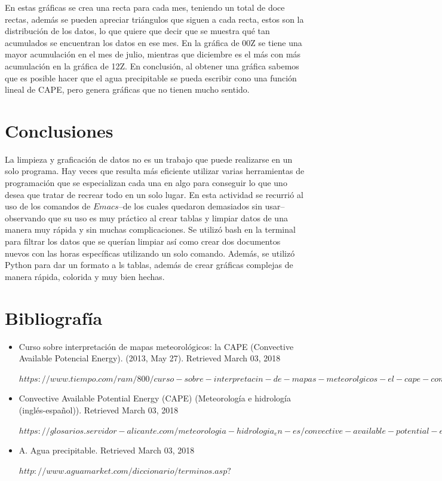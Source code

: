 \documentclass{article}
\begin{document}
En estas gráficas se crea una recta para cada mes, teniendo un total de doce rectas, además se pueden apreciar triángulos que siguen a cada recta, estos son la distribución de los datos, lo que quiere que decir que se muestra qué tan acumulados se encuentran los datos en ese mes. En la gráfica de 00Z se tiene una mayor acumulación en el mes de julio, mientras que diciembre es el más con más acumulación en la gráfica de 12Z. En conclusión, al obtener una gráfica sabemos que es posible hacer que el agua precipitable se pueda escribir cono una función lineal de CAPE, pero genera gráficas que no tienen mucho sentido.

\section{Conclusiones}
La limpieza y graficación de datos no es un trabajo que puede realizarse en un solo programa. Hay veces que resulta más eficiente utilizar varias herramientas de programación que se especializan cada una en algo para conseguir lo que uno desea que tratar de recrear todo en un solo lugar. En esta actividad se recurrió al uso de los comandos de $Emacs$--de los cuales quedaron demasiados sin usar--observando que su uso es muy práctico al crear tablas y limpiar datos de una manera muy rápida y sin muchas complicaciones. Se utilizó bash en la terminal para filtrar los datos que se querían limpiar así como crear dos documentos nuevos con las horas específicas utilizando un solo comando. Además, se utilizó Python para dar un formato a ls tablas, además de crear gráficas complejas de manera rápida, colorida y muy bien hechas.

\section{Bibliografía}
\begin{itemize}
\item Curso sobre interpretación de mapas meteorológicos: la CAPE (Convective Available Potencial Energy). (2013, May 27). Retrieved March 03, 2018

$https://www.tiempo.com/ram/800/curso-sobre-interpretacin-de-mapas-meteorolgicos-el-cape-convective-available-potencial-energy/$

\item Convective Available Potential Energy (CAPE) (Meteorología e hidrología (inglés-español)). Retrieved March 03, 2018

$https://glosarios.servidor-alicante.com/meteorologia-hidrologia_en-es/convective-available-potential-energy-cape$

\item A. Agua precipitable. Retrieved March 03, 2018

$http://www.aguamarket.com/diccionario/terminos.asp?$

\end{itemize}
\end{document}
